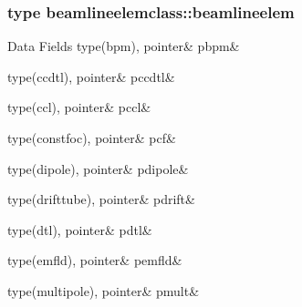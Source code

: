 \subsubsection{type beamlineelemclass\+::beamlineelem}
\begin{DoxyFields}{Data Fields}
\mbox{\label{namespacebeamlineelemclass_ab1486848bf9231eeed15a83170442e32}} 
type(bpm), pointer&
pbpm&
\\
\hline

\mbox{\label{namespacebeamlineelemclass_afc03034604a05eb1bc374945e4ab176d}} 
type(ccdtl), pointer&
pccdtl&
\\
\hline

\mbox{\label{namespacebeamlineelemclass_ac12416dfd09e0a7195c5297b12c1194f}} 
type(ccl), pointer&
pccl&
\\
\hline

\mbox{\label{namespacebeamlineelemclass_a39cb4d5220b28f075e92fd09819f86ce}} 
type(constfoc), pointer&
pcf&
\\
\hline

\mbox{\label{namespacebeamlineelemclass_a2427f96729e2667041326c4dcf583b82}} 
type(dipole), pointer&
pdipole&
\\
\hline

\mbox{\label{namespacebeamlineelemclass_a295bb7932c8566c26f980d0bd89d2f7d}} 
type(drifttube), pointer&
pdrift&
\\
\hline

\mbox{\label{namespacebeamlineelemclass_a8efdbd654fcb17a5dcf4826638e79720}} 
type(dtl), pointer&
pdtl&
\\
\hline

\mbox{\label{namespacebeamlineelemclass_a626e5426ee98993dfe2352be10075411}} 
type(emfld), pointer&
pemfld&
\\
\hline

\mbox{\label{namespacebeamlineelemclass_aa189f35902f7b7265e0485c363023f28}} 
type(multipole), pointer&
pmult&
\\
\hline


\end{DoxyFields}
